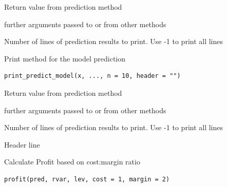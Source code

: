 \documentclass[a4paper]{book}
\begin{document}
%
\begin{Arguments}
\begin{ldescription}
\item[\code{x}] Return value from prediction method

\item[\code{...}] further arguments passed to or from other methods

\item[\code{n}] Number of lines of prediction results to print. Use -1 to print all lines
\end{ldescription}
\end{Arguments}
%
\begin{Description}
Print method for the model prediction
\end{Description}
%
\begin{Usage}
\begin{verbatim}
print_predict_model(x, ..., n = 10, header = "")
\end{verbatim}
\end{Usage}
%
\begin{Arguments}
\begin{ldescription}
\item[\code{x}] Return value from prediction method

\item[\code{...}] further arguments passed to or from other methods

\item[\code{n}] Number of lines of prediction results to print. Use -1 to print all lines

\item[\code{header}] Header line
\end{ldescription}
\end{Arguments}
%
\begin{Description}
Calculate Profit based on cost:margin ratio
\end{Description}
%
\begin{Usage}
\begin{verbatim}
profit(pred, rvar, lev, cost = 1, margin = 2)
\end{verbatim}
\end{Usage}
%
\end{document}
